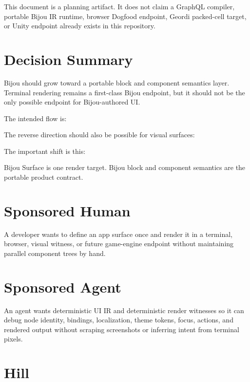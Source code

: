 This document is a planning artifact. It does not claim a GraphQL compiler, portable Bijou IR runtime, browser Dogfood endpoint, Geordi packed-cell target, or Unity endpoint already exists in this repository.

\section{Decision Summary}\label{record-139-decision-summary}

Bijou should grow toward a portable block and component semantics layer. Terminal rendering remains a first-class Bijou endpoint, but it should not be the only possible endpoint for Bijou-authored UI.

The intended flow is:



The reverse direction should also be possible for visual surfaces:



The important shift is this:

\begin{CodeBlock}
Bijou Surface is one render target.
Bijou block and component semantics are the portable product contract.
\end{CodeBlock}

\section{Sponsored Human}\label{record-139-sponsored-human}

A developer wants to define an app surface once and render it in a terminal, browser, visual witness, or future game-engine endpoint without maintaining parallel component trees by hand.

\section{Sponsored Agent}\label{record-139-sponsored-agent}

An agent wants deterministic UI IR and deterministic render witnesses so it can debug node identity, bindings, localization, theme tokens, focus, actions, and rendered output without scraping screenshots or inferring intent from terminal pixels.

\section{Hill}\label{record-139-hill}

